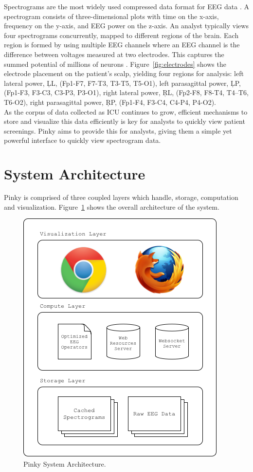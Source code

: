 Spectrograms are the most widely used compressed data format for EEG data
\cite{ceeg-1}. A spectrogram consists of three-dimensional plots with time on
the x-axis, frequency on the y-axis, and EEG power on the z-axis. An analyst
typically views four spectrograms concurrently, mapped to different regions of
the brain. Each region is formed by using multiple EEG channels where an EEG
channel is the difference between voltages measured at two electrodes. This
captures the summed potential of millions of neurons \cite{eeg-ml}.
Figure~\ref{fig:electrodes} shows the electrode placement on the patient's
scalp, yielding four regions for analysis: left lateral power, \c{LL}, (Fp1-F7,
F7-T3, T3-T5, T5-O1), left parasagittal power, \c{LP}, (Fp1-F3, F3-C3, C3-P3,
P3-O1), right lateral power, \c{RL}, (Fp2-F8, F8-T4, T4–T6, T6-O2), right
parasagittal power, \c{RP}, (Fp1-F4, F3-C4, C4-P4, P4-O2).  \\

As the corpus of data collected as ICU continues to grow, efficient mechanisms
to store and visualize this data efficiently is key for analysts to quickly
view patient screenings. Pinky aims to provide this for analysts, giving them a
simple yet powerful interface to quickly view spectrogram data.

\section{System Architecture}

Pinky is comprised of three coupled layers which handle, storage, computation
and visualization. Figure~\ref{fig:system-architecture} shows the overall
architecture of the system.

\begin{figure}[h]
\begin{center}
\includegraphics[scale=0.75]{./img/system-architecture.png}
\caption{Pinky System Architecture.}
\label{fig:system-architecture}
\end{center}
\end{figure}

